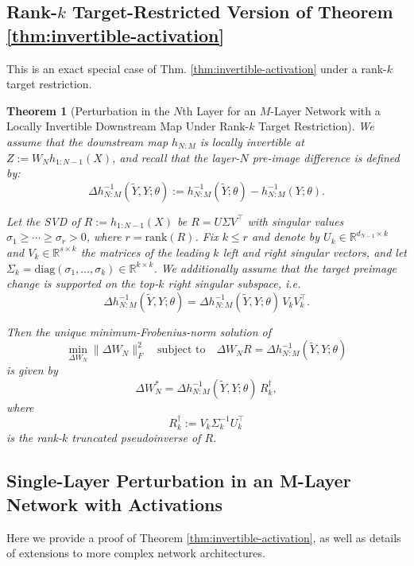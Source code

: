 \documentclass{article}
\theoremstyle{plain}
\newtheorem{theorem}{Theorem}[section]
\theoremstyle{definition}
\theoremstyle{remark}
\begin{document}
\subsection{Rank-$k$ Target-Restricted Version of Theorem \ref{thm:invertible-activation}}\label{app:trunc}
This is an exact special case of Thm. \ref{thm:invertible-activation} under a rank-$k$ target restriction.

\begin{theorem}[Perturbation in the $N$th Layer for an $M$-Layer Network with a Locally Invertible Downstream Map Under Rank-$k$ Target Restriction]
\label{thm:trunc}
We assume that the downstream map \(h_{N:M}\) is locally invertible at \(Z := W_N h_{1:N-1}(X)\), and recall that the layer-$N$ pre-image difference is defined by:
\[
\Delta h_{N:M}^{-1}(\tilde Y, Y;\theta) := h_{N:M}^{-1}(\tilde Y;\theta) - h_{N:M}^{-1}(Y;\theta).
\]

Let the SVD of $R:=h_{1:N-1}(X)$ be $R = U\Sigma V^\top$ with singular values
$\sigma_1\ge\cdots\ge\sigma_r>0$, where $r=\mathrm{rank}(R)$.
Fix $k\le r$ and denote by $U_k\in\mathbb{R}^{d_{N-1}\times k}$ and $V_k\in\mathbb{R}^{s\times k}$
the matrices of the leading $k$ left and right singular vectors, and let
$\Sigma_k=\mathrm{diag}(\sigma_1,\dots,\sigma_k)\in\mathbb{R}^{k\times k}$.
We additionally assume that the target preimage change is supported on the top-$k$ right singular subspace, i.e.
\[
\Delta h_{N:M}^{-1}(\tilde Y, Y;\theta) = \Delta h_{N:M}^{-1}(\tilde Y, Y;\theta)\,V_k V_k^\top.
\]

Then the unique minimum-Frobenius-norm solution of
\[
\min_{\Delta W_N} \|\Delta W_N\|_F^2
\quad\text{subject to}\quad
\Delta W_N R  = \Delta h_{N:M}^{-1}(\tilde Y, Y;\theta)
\]
is given by
\[
\Delta W_N^\ast = \Delta h_{N:M}^{-1}(\tilde Y, Y;\theta)\,R_k^\dagger,
\]
where
\[
R_k^\dagger := V_k \Sigma_k^{-1} U_k^\top
\]
is the rank-$k$ truncated pseudoinverse of $R$.
\end{theorem}


\subsection{Single-Layer Perturbation in an M-Layer Network with Activations}\label{mlayeract_proof}

Here we provide a proof of Theorem \ref{thm:invertible-activation}, as well as details of extensions to more complex network architectures.
\end{document}
